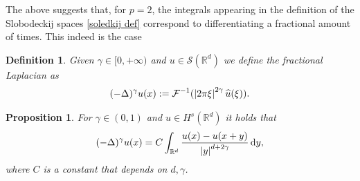\documentclass[
    a4paper,
    DIV=14,
    abstract=true,
    numbers=noenddot
]
{scrartcl}
\newtheorem{proposition}[theorem]{Proposition}
\newtheorem{definition}[theorem]{Definition}
\theoremstyle{definition}
\newcommand{\wh}[1]{\widehat{#1}}
\renewcommand{\d}{\,\mathrm{d}}\newcommand{\dx}{\,\mathrm{d}x}
\newcommand{\R}{\mathbb{R}}
\newcommand{\Ss}{\mathcal{S}}
\begin{document}
The above suggests that, for $p=2$, the integrals appearing in the definition of the Slobodeckij spaces \ref{soledkij def} correspond to differentiating a fractional amount of times. This indeed is the case
\begin{definition}
    Given $\gamma  \in [0,+\infty)$ and $u \in \Ss (\R^d)$ we define the fractional Laplacian as
    \begin{align*}
        (-\Delta )^{\gamma }u(x):= \mathcal{F}^{-1}(\abs{2\pi\xi}^{2\gamma }\wh{u}(\xi )).
    \end{align*}
\end{definition}
\begin{proposition}
    For $\gamma  \in (0,1)$ and $u \in H^{s}(\R^d)$ it holds that
    \begin{align*}
        (-\Delta )^{\gamma }u(x)=C\int_{\R^d}\frac{u(x)-u(x+y)}{\abs{y}^{d+2\gamma}}\d y,
    \end{align*}
    where $C$ is a constant that depends on $d,\gamma $.
\end{proposition}
\end{document}
